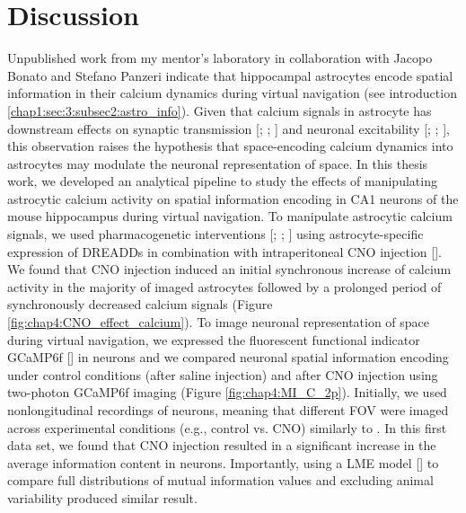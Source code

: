 
\chapter{Discussion} %

\label{Discussion} %
Unpublished work from my mentor's laboratory in collaboration with Jacopo Bonato and Stefano Panzeri indicate that hippocampal astrocytes encode spatial information in their calcium dynamics during virtual navigation (see introduction \ref{chap1:sec:3:subsec2:astro_info}). 
Given that calcium signals in astrocyte has downstream effects on synaptic transmission [\cite{panatier2006}; \cite{henneberger2010}; \cite{fellin2009}] and neuronal excitability [\cite{jourdain2007}; \cite{kang1998}; \cite{liu2004}], this observation raises the hypothesis that space-encoding calcium dynamics into astrocytes may modulate the neuronal representation of space. 
In this thesis work, we developed an analytical pipeline to study the effects of manipulating astrocytic calcium activity on spatial information encoding in CA1 neurons of the mouse hippocampus during virtual navigation. 
To manipulate astrocytic calcium signals, we used pharmacogenetic interventions [\cite{roth2016dreadds}; \cite{armbruster2005creation}; \cite{armbruster2007evolving}] using astrocyte-specific expression of DREADDs in combination with intraperitoneal CNO injection [\cite{adamsky2018astrocytic}].
We found that CNO injection induced an initial synchronous increase of calcium activity in the majority of imaged astrocytes followed by a prolonged period of synchronously decreased calcium signals (Figure \ref{fig:chap4:CNO_effect_calcium}). 
To image neuronal representation of space during virtual navigation, we expressed the fluorescent functional indicator GCaMP6f [\cite{chen2013}] in neurons and we compared neuronal spatial information encoding under control conditions (after saline injection) and after CNO injection using two-photon GCaMP6f imaging (Figure \ref{fig:chap4:MI_C_2p}). 
Initially, we used nonlongitudinal recordings of neurons, meaning that different FOV were imaged across experimental conditions (e.g., control vs. CNO) similarly to \cite{dombeck2010}.
In this first data set, we found that CNO injection resulted in a significant increase in the average information content in neurons.
Importantly, using a LME model [\cite{pinheiro2000linear}] to compare full distributions of mutual information values and excluding animal variability produced similar result. 

